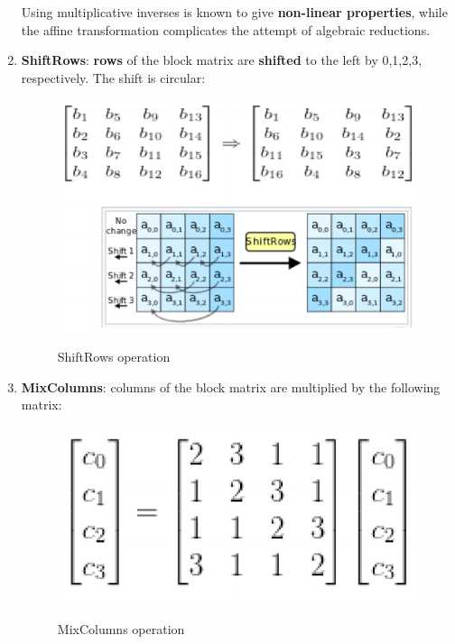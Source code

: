 \begin{enumerate}
    Using multiplicative inverses is known to give \textbf{non-linear properties}, while the affine transformation complicates the attempt of algebraic reductions.

    \item \textbf{ShiftRows}: \textbf{rows} of the block matrix are \textbf{shifted} to the left by 0,1,2,3, respectively. The shift is circular:

    \begin{figure}[h!]
        \centering
        \includegraphics[scale = 0.8]{img/aes6.png}
        \label{aes6}
        \caption{ShiftRows operation}
    \end{figure}

    \item \textbf{MixColumns}: columns of the block matrix are multiplied by the following matrix:

    \begin{figure}[h!]
        \centering
        \includegraphics[scale = 0.8]{img/aes7.png}
        \label{aes7}
        \caption{MixColumns operation}
    \end{figure}


\end{enumerate}
